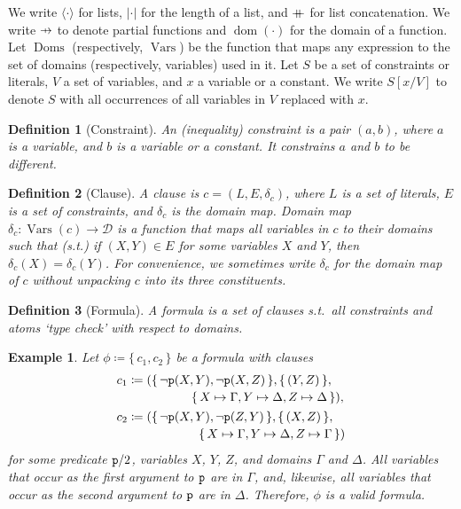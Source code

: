 \documentclass{article}
\newtheorem{example}{Example}
\newtheorem{definition}{Definition}
\newcommand\pfun{\mathrel{\ooalign{\hfil$\mapstochar\mkern5mu$\hfil\cr$\to$\cr}}}
\newcommand\mdoubleplus{\mathbin{+\mkern-10mu+}}
\newcommand{\predicate}{\texttt{\textup{p}}}
\DeclareMathOperator{\dom}{dom}
\DeclareMathOperator{\Doms}{Doms}
\DeclareMathOperator{\Vars}{Vars}
\begin{document}
We write $\langle\cdot\rangle$ for lists, $|\cdot|$ for the length of a list,
and $\mdoubleplus$ for list concatenation. We write $\pfun$ to denote partial
functions and $\dom(\cdot)$ for the domain of a function. Let $\Doms$
(respectively, $\Vars$) be the function that maps any expression to the set of
domains (respectively, variables) used in it. Let $S$ be a set of constraints or
literals, $V$ a set of variables, and $x$ a variable or a constant. We write
$S[x/V]$ to denote $S$ with all occurrences of all variables in $V$ replaced
with $x$.

\begin{definition}[Constraint]\label{def:constraint}
  An \emph{(inequality) constraint} is a pair $(a, b)$, where $a$ is a variable,
  and $b$ is a variable or a constant. It constrains $a$ and $b$ to be
  different.
\end{definition}

\begin{definition}[Clause]\label{def:clause}
  A \emph{clause} is $c = (L, E, \delta_c)$, where $L$ is a set of literals, $E$
  is a set of constraints, and $\delta_c$ is the domain map. \emph{Domain map}
  $\delta_{c}\colon \Vars(c) \to \mathcal{D}$ is a function that maps all
  variables in $c$ to their domains such that (s.t.) if $(X, Y) \in E$ for some
  variables $X$ and $Y$, then $\delta_c(X) = \delta_c(Y)$. For convenience, we
  sometimes write $\delta_c$ for the domain map of $c$ without unpacking $c$
  into its three constituents.
\end{definition}

\begin{definition}[Formula]\label{def:formula}
  A \emph{formula} is a set of clauses s.t.\ all constraints and atoms `type
  check' with respect to domains.
\end{definition}

\begin{example}\label{example:first}
  Let $\phi \coloneqq \{\, c_1, c_2 \,\}$ be a formula with clauses
  \begin{align*}
    c_1 &\coloneqq
          \begin{multlined}[t]
            (\{\, \neg \predicate(X, Y), \neg \predicate(X, Z) \,\}, \{\, (Y, Z) \,\}, \\
            \{\, X \mapsto \Gamma, Y \mapsto \Delta, Z \mapsto \Delta \,\}),
          \end{multlined}\\
    c_2 &\coloneqq
          \begin{multlined}[t]
            (\{\, \neg \predicate(X, Y), \neg \predicate(Z, Y) \,\}, \{\, (X, Z) \,\}, \\
            \{\, X \mapsto \Gamma, Y \mapsto \Delta, Z \mapsto \Gamma \,\})
          \end{multlined}
  \end{align*}
  for some predicate $\predicate/2$, variables $X$, $Y$, $Z$, and domains
  $\Gamma$ and $\Delta$. All variables that occur as the first argument to
  $\predicate$ are in $\Gamma$, and, likewise, all variables that occur as the
  second argument to $\predicate$ are in $\Delta$. Therefore, $\phi$ is a valid
  formula.
\end{example}
\end{document}
